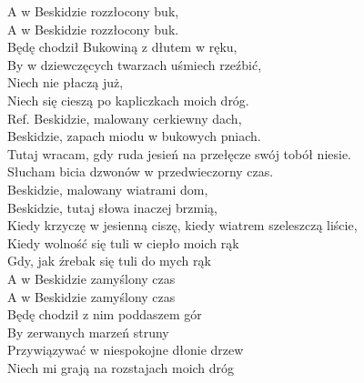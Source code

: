
\begin{flushleft}
A w Beskidzie rozzłocony buk, \tab{}\\
A w Beskidzie rozzłocony buk. \tab{}\\
Będę chodził Bukowiną z dłutem w ręku,\tab{} \\
By w dziewczęcych twarzach uśmiech rzeźbić, \tab{}\\
Niech nie płaczą już, \tab{}\tab{}\\
Niech się cieszą po kapliczkach moich dróg. \tab{} \\
\vskip 3mm
Ref. Beskidzie, malowany cerkiewny dach,\tab{}\tab{} \\
\hspace{0.9cm}Beskidzie, zapach miodu w bukowych pniach. \tab{}\\
\hspace{0.9cm}Tutaj wracam, gdy ruda jesień na przełęcze swój tobół niesie. \\
\hspace{0.9cm}Słucham bicia dzwonów w przedwieczorny czas. \tab{}\\
\hspace{0.9cm}Beskidzie, malowany wiatrami dom,  \tab{}\tab{}\\
\hspace{0.9cm}Beskidzie, tutaj słowa inaczej brzmią, \tab{}\tab{}\\
\hspace{0.9cm}Kiedy krzyczę w jesienną ciszę, kiedy wiatrem szeleszczą liście,  \\
\hspace{0.9cm}Kiedy wolność się tuli w ciepło moich rąk \tab{}\\
\hspace{0.9cm}Gdy, jak źrebak się tuli do mych rąk \tab{}\tab{}\\
\vskip 3mm
A w Beskidzie zamyślony czas \\
A w Beskidzie zamyślony czas \\
Będę chodził z nim poddaszem gór \\
By zerwanych marzeń struny \\
Przywiązywać w niespokojne dłonie drzew \\
Niech mi grają na rozstajach moich dróg \\

\end{flushleft}
